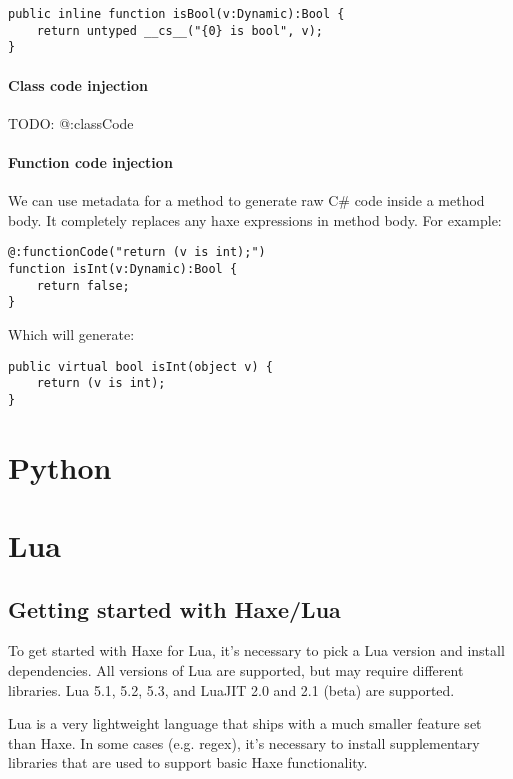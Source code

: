 \begin{lstlisting}
public inline function isBool(v:Dynamic):Bool {
    return untyped __cs__("{0} is bool", v);
}
\end{lstlisting}

\paragraph{Class code injection}

TODO: @:classCode

\paragraph{Function code injection}

We can use  metadata for a method to generate raw C# code inside a method body. It completely replaces any haxe expressions in method body. For example:

\begin{lstlisting}
@:functionCode("return (v is int);")
function isInt(v:Dynamic):Bool {
    return false;
}
\end{lstlisting}

Which will generate:

\begin{lstlisting}
public virtual bool isInt(object v) {
    return (v is int);
}
\end{lstlisting}


\section{Python}
\label{target-python}

\section{Lua}
\label{target-lua}

\subsection{Getting started with Haxe/Lua}
\label{target-lua-getting-started}

To get started with Haxe for Lua, it's necessary to pick a Lua version and install
dependencies.  All versions of Lua are supported, but may require different
libraries.  Lua 5.1, 5.2, 5.3, and LuaJIT 2.0 and 2.1 (beta) are supported.

Lua is a very lightweight language that ships with a much smaller  feature set
than Haxe.  In some cases (e.g. regex), it's necessary to install supplementary
libraries that are used to support basic Haxe functionality.

